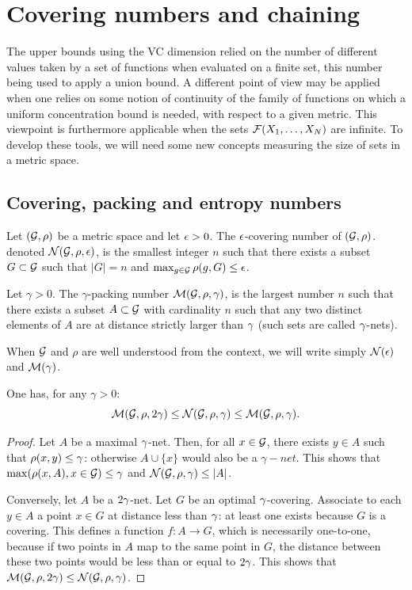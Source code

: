 \section{Covering numbers and chaining}
The upper bounds using the VC dimension relied on the number of different values taken by a set of functions when evaluated on a finite set, this number being used to apply a union bound. A different point of view may be applied when one relies on some notion of continuity of the family of functions on which a uniform concentration bound is needed, with respect to a given metric. This viewpoint is furthermore applicable when the sets ${\mathcal F}(X_1, \ldots, X_N)$ are infinite. To develop these tools, we will need some new concepts measuring the size of sets in a metric space.

\subsection{Covering, packing and entropy numbers}
\label{sec:covering}

\begin{definition}
\label{def:covering.number}
Let $({\mathcal G}, \rho)$ be a metric space and let $\epsilon>0$. The $\epsilon$-covering number of $({\mathcal G}, \rho)$. denoted ${\mathcal N}({\mathcal G}, \rho, \epsilon)$, is the smallest integer $n$ such that there exists a subset $G\subset{\mathcal G}$ such that $|G|=n$ and $\max_{g\in {\mathcal G}} \rho(g, G) \leq \epsilon$. 

Let $\gamma>0$. The $\gamma$-packing number ${\mathcal M}({\mathcal G}, \rho, \gamma)$, is the largest number $n$ such that there exists a subset $A\subset{\mathcal G}$ with cardinality $n$ such that any two distinct elements of $A$ are at distance strictly larger than $\gamma$ (such sets are called $\gamma$-nets). 

When ${\mathcal G}$ and $\rho$ are well understood from the context, we will write simply ${\mathcal N}(\epsilon)$ and ${\mathcal M}(\gamma)$.
\end{definition}

\begin{proposition}
\label{prop:pack.cov}
One has, for any $\gamma>0$:
\[
{\mathcal M}({\mathcal G}, \rho, 2\gamma)\leq {\mathcal N}({\mathcal G}, \rho, \gamma)\leq {\mathcal M}({\mathcal G}, \rho, \gamma).
\]
\end{proposition}
\begin{proof}
Let $A$ be a maximal $\gamma$-net. Then, for all $x\in {\mathcal G}$, there exists $y\in A$ such that $\rho(x,y) \leq \gamma$: otherwise $A\cup \{x\}$ would also be a $\gamma-net$. This shows that $\max(\rho(x, A), x\in{\mathcal G}) \leq \gamma$ and ${\mathcal N}({\mathcal G}, \rho, \gamma) \leq |A|$. 

Conversely, let $A$ be a $2\gamma$-net. Let $G$ be an optimal $\gamma$-covering. Associate to each $y\in A$ a point $x\in G$ at distance less than $\gamma$: at least one exists because $G$ is a covering. This defines a function $f: A\to G$, which is necessarily one-to-one, because if two points in $A$ map to the same point in $G$, the distance between these two points would be less than or equal to $2\gamma$. This shows that ${\mathcal M}({\mathcal G}, \rho, 2\gamma)\leq {\mathcal N}({\mathcal G}, \rho, \gamma)$.
\end{proof}

